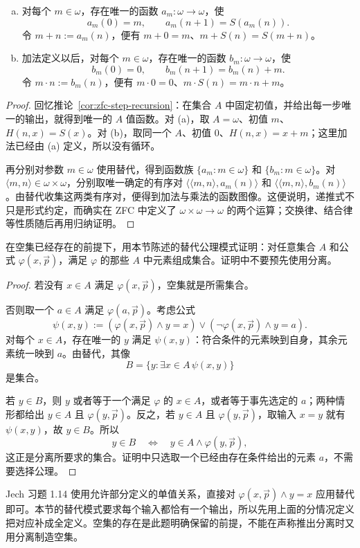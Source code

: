 \documentclass[lang=cn,a4paper,fontset=none,zihao=false,10pt,openany,twoside]{beautybook}
\numberwithin{algorithm}{chapter}
\begin{document}
\begin{example}[用递归定义加法与乘法]
\begin{enumerate}[(a)]
\item 对每个 $m\in\omega$，存在唯一的函数 $a_m:\omega\to\omega$，使
\[
 a_m(0)=m,\qquad a_m(n+1)=S(a_m(n)).
\]
令 $m+n:=a_m(n)$，便有 $m+0=m$、$m+S(n)=S(m+n)$。
\item 加法定义以后，对每个 $m\in\omega$，存在唯一的函数 $b_m:\omega\to\omega$，使
\[
 b_m(0)=0,\qquad b_m(n+1)=b_m(n)+m.
\]
令 $m\cdot n:=b_m(n)$，便有 $m\cdot0=0$、$m\cdot S(n)=m\cdot n+m$。
\end{enumerate}
\end{example}
\begin{proof}
回忆推论~\ref{cor:zfc-step-recursion}：在集合 $A$ 中固定初值，并给出每一步唯一的输出，就得到唯一的 $A$ 值函数。对 (a)，取 $A=\omega$、初值 $m$、$H(n,x)=S(x)$。对 (b)，取同一个 $A$、初值 $0$、$H(n,x)=x+m$；这里加法已经由 (a) 定义，所以没有循环。

再分别对参数 $m\in\omega$ 使用替代，得到函数族 $\{a_m:m\in\omega\}$ 和 $\{b_m:m\in\omega\}$。对 $\langle m,n\rangle\in\omega\times\omega$，分别取唯一确定的有序对 $\langle\langle m,n\rangle,a_m(n)\rangle$ 和 $\langle\langle m,n\rangle,b_m(n)\rangle$。由替代收集这两类有序对，便得到加法与乘法的函数图像。这便说明，递推式不只是形式约定，而确实在 ZFC 中定义了 $\omega\times\omega\to\omega$ 的两个运算；交换律、结合律等性质随后再用归纳证明。
\end{proof}

\begin{example}[从替代推出分离]
在空集已经存在的前提下，用本节陈述的替代公理模式证明：对任意集合 $A$ 和公式 $\varphi(x,\vec p)$，满足 $\varphi$ 的那些 $A$ 中元素组成集合。证明中不要预先使用分离。
\end{example}
\begin{proof}
若没有 $x\in A$ 满足 $\varphi(x,\vec p)$，空集就是所需集合。

否则取一个 $a\in A$ 满足 $\varphi(a,\vec p)$。考虑公式
\[
 \psi(x,y):=
 (\varphi(x,\vec p)\wedge y=x)
 \vee(\neg\varphi(x,\vec p)\wedge y=a).
\]
对每个 $x\in A$，存在唯一的 $y$ 满足 $\psi(x,y)$：符合条件的元素映到自身，其余元素统一映到 $a$。由替代，其像
\[
 B=\{y:\exists x\in A\,\psi(x,y)\}
\]
是集合。

若 $y\in B$，则 $y$ 或者等于一个满足 $\varphi$ 的 $x\in A$，或者等于事先选定的 $a$；两种情形都给出 $y\in A$ 且 $\varphi(y,\vec p)$。反之，若 $y\in A$ 且 $\varphi(y,\vec p)$，取输入 $x=y$ 就有 $\psi(x,y)$，故 $y\in B$。所以
\[
 y\in B\quad\Longleftrightarrow\quad y\in A\wedge\varphi(y,\vec p),
\]
这正是分离所要求的集合。证明中只选取一个已经由存在条件给出的元素 $a$，不需要选择公理。
\end{proof}
\begin{remark}[替代模式的两种表述]
Jech 习题 1.14 使用允许部分定义的单值关系，直接对 $\varphi(x,\vec p)\wedge y=x$ 应用替代即可。本节的替代模式要求每个输入都恰有一个输出，所以先用上面的分情况定义把对应补成全定义。空集的存在是此题明确保留的前提，不能在声称推出分离时又用分离制造空集。
\end{remark}
\end{document}

